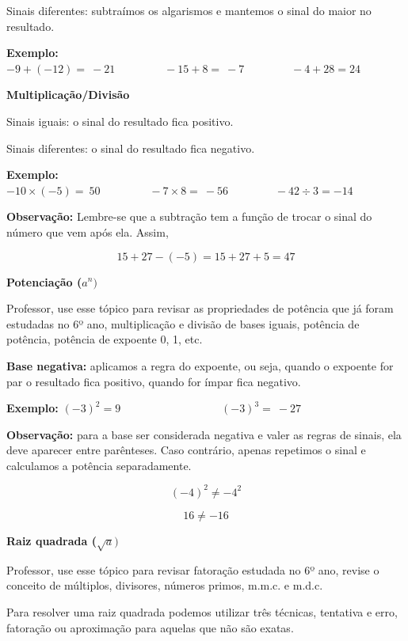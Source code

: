 {{Sinais diferentes: subtraímos os algarismos e mantemos o sinal do maior
no resultado.

\textbf{Exemplo:}
\(- 9 + \left( - 12 \right) = \  - 21\ \ \ \ \ \ \ \ \ \ \ \ \ \ \ \ \ \ \ \  - 15 + 8 = \  - 7\ \ \ \ \ \ \ \ \ \ \ \ \ \ \ \ \ \ \  - 4 + 28 = 24\)

\textbf{Multiplicação/Divisão}

Sinais iguais: o sinal do resultado fica positivo.

Sinais diferentes: o sinal do resultado fica negativo.

\textbf{Exemplo:}
\(- 10 \times \left( - 5 \right) = \ 50\ \ \ \ \ \ \ \ \ \ \ \ \ \ \ \ \ \ \ \  - 7 \times 8 = \  - 56\ \ \ \ \ \ \ \ \ \ \ \ \ \ \ \ \ \ \  - 42 \div 3 = - 14\)

\textbf{Observação:} Lembre-se que a subtração tem a função de trocar o
sinal do número que vem após ela. Assim,

\[15 + 27 - \left( - 5 \right) = 15 + 27 + 5 = 47\]

\textbf{Potenciação (}\(a^{n})\)

Professor, use esse tópico para revisar as propriedades de potência que
já foram estudadas no 6º ano, multiplicação e divisão de bases iguais,
potência de potência, potência de expoente 0, 1, etc.

\textbf{Base negativa:} aplicamos a regra do expoente, ou seja, quando o
expoente for par o resultado fica positivo, quando for ímpar fica
negativo.

\textbf{\hfill\break
Exemplo:}
\(\left( - 3 \right)^{2} = 9\ \ \ \ \ \ \ \ \ \ \ \ \ \ \ \ \ \ \ \ \ \ \ \ \ \ \ \ \ \ \ \ \ \ \ \ \ \ \ \ \ \left( - 3 \right)^{3} = \  - 27\ \ \ \ \ \ \ \)

\textbf{Observação:} para a base ser considerada negativa e valer as
regras de sinais, ela deve aparecer entre parênteses. Caso contrário,
apenas repetimos o sinal e calculamos a potência separadamente.

\[\left( - 4 \right)^{2} \neq - 4^{2}\]

\[16 \neq - 16\]

\textbf{Raiz quadrada (}\(\sqrt{a})\)

Professor, use esse tópico para revisar fatoração estudada no 6º ano,
revise o conceito de múltiplos, divisores, números primos, m.m.c. e
m.d.c.

Para resolver uma raiz quadrada podemos utilizar três técnicas,
tentativa e erro, fatoração ou aproximação para aquelas que não são
exatas.

}}
